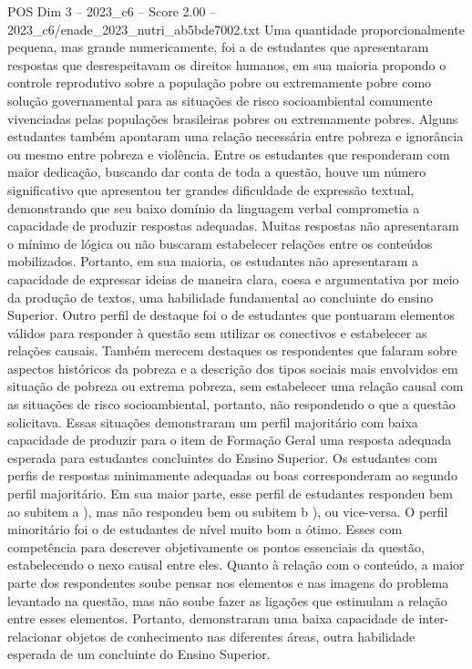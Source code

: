 \begin{textsample}{POS Dim 3 – 2023\_c6 – Score 2.00 – 2023\_c6/enade\_2023\_nutri\_ab5bde7002.txt}
Uma quantidade proporcionalmente pequena, mas grande numericamente, foi a de estudantes que apresentaram respostas que desrespeitavam os direitos humanos, em sua maioria propondo o controle reprodutivo sobre a população pobre ou extremamente pobre como solução governamental para as situações de risco socioambiental comumente vivenciadas pelas populações brasileiras pobres ou extremamente pobres.
Alguns estudantes também apontaram uma relação necessária entre pobreza e ignorância ou mesmo entre pobreza e violência.
Entre os estudantes que responderam com maior dedicação, buscando dar conta de toda a questão, houve um número significativo que apresentou ter grandes dificuldade de expressão textual, demonstrando que seu baixo domínio da linguagem verbal comprometia a capacidade de produzir respostas adequadas.
Muitas respostas não apresentaram o mínimo de lógica ou não buscaram estabelecer relações entre os conteúdos mobilizados.
Portanto, em sua maioria, os estudantes não apresentaram a capacidade de expressar ideias de maneira clara, coesa e argumentativa por meio da produção de textos, uma habilidade fundamental ao concluinte do ensino Superior.
Outro perfil de destaque foi o de estudantes que pontuaram elementos válidos para responder à questão sem utilizar os conectivos e estabelecer as relações causais.
Também merecem destaques os respondentes que falaram sobre aspectos históricos da pobreza e a descrição dos tipos sociais mais envolvidos em situação de pobreza ou extrema pobreza, sem estabelecer uma relação causal com as situações de risco socioambiental, portanto, não respondendo o que a questão solicitava.
Essas situações demonstraram um perfil majoritário com baixa capacidade de produzir para o item de Formação Geral uma resposta adequada esperada para estudantes concluintes do Ensino Superior.
Os estudantes com perfis de respostas minimamente adequadas ou boas corresponderam ao segundo perfil majoritário.
Em sua maior parte, esse perfil de estudantes respondeu bem ao subitem a ), mas não respondeu bem ou subitem b ), ou vice-versa.
O perfil minoritário foi o de estudantes de nível muito bom a ótimo.
Esses com competência para descrever objetivamente os pontos essenciais da questão, estabelecendo o nexo causal entre eles.
Quanto à relação com o conteúdo, a maior parte dos respondentes soube pensar nos elementos e nas imagens do problema levantado na questão, mas não soube fazer as ligações que estimulam a relação entre esses elementos.
Portanto, demonstraram uma baixa capacidade de inter-relacionar objetos de conhecimento nas diferentes áreas, outra habilidade esperada de um concluinte do Ensino Superior.

\end{textsample}
